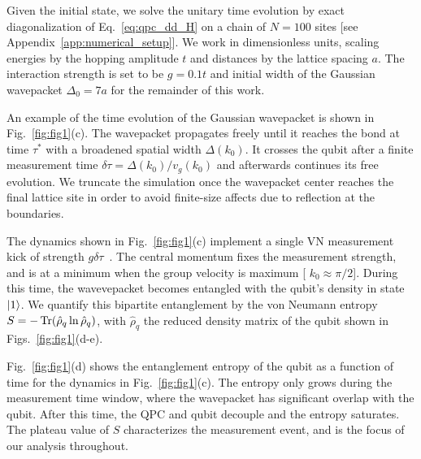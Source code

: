 \documentclass[10pt,
 amsmath,amssymb,
 aps,prb, twocolumn
]{revtex4-2}
\begin{document}
Given the initial state, we solve the unitary time evolution by exact diagonalization of Eq.~\eqref{eq:qpc_dd_H} on a chain of $N=100$ sites [see Appendix~\ref{app:numerical_setup}]. We work in dimensionless units, scaling energies by the hopping amplitude $t$ and distances by the lattice spacing $a$. The interaction strength is set to be $g=0.1t$ and initial width of the Gaussian wavepacket $\Delta_0=7a$ for the remainder of this work. 

An example of the time evolution of the Gaussian wavepacket is shown in Fig.~\ref{fig:fig1}(c). The wavepacket propagates freely until it reaches the bond at time $\tau^*$ with a broadened spatial width $\Delta(k_0)$. It crosses the qubit after a finite measurement time $\delta \tau = \Delta(k_0)/v_g(k_0)$ and afterwards continues its free evolution. We truncate the simulation once the wavepacket center reaches the final lattice site in order to avoid finite-size affects due to reflection at the boundaries.

The dynamics shown in Fig.~\ref{fig:fig1}(c) implement a single VN measurement kick of strength $g\delta \tau$~\cite{vonNeumann1932,svensson2013, siddiqi2024, tamir013}. The central momentum fixes the measurement strength, and is at a minimum when the group velocity is maximum [ \mbox{$k_0 \approx \pi /2$}]. During this time, the wavevepacket becomes entangled with the qubit's density in state \mbox{$\ket{1}$}. We quantify this bipartite entanglement by the von Neumann entropy $S=-\Tr(\hat{\rho}_q\ln\hat{\rho}_q)$, with $\hat{\rho}_q$ the reduced density matrix of the qubit shown in Figs.~\ref{fig:fig1}(d-e). 

Fig.~\ref{fig:fig1}(d) shows the entanglement entropy of the qubit as a function of time for the dynamics in Fig.~\ref{fig:fig1}(c).
The entropy only grows during the measurement time window, where the wavepacket has significant overlap with the qubit. After this time, the QPC and qubit decouple and the entropy saturates. The plateau value of $S$ characterizes the measurement event, and is the focus of our analysis throughout. 
\end{document}

